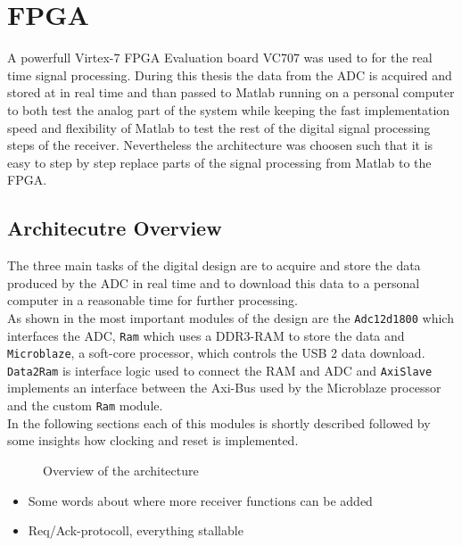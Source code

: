 \chapter{FPGA}
\label{chap:fpga}
A powerfull Virtex-7 \gls{FPGA} Evaluation board VC707
was used to for the real time signal processing.
During this thesis the data from the \gls{ADC} is acquired and stored at in real
time and than passed to Matlab running on a personal computer to both test
the analog part of the system while keeping the fast implementation speed
and flexibility of Matlab to test the rest of the digital signal processing steps
of the receiver. Nevertheless the architecture was choosen such that it is easy
to step by step replace parts of the signal processing from Matlab to the
\gls{FPGA}.

\section{Architecutre Overview}
The three main tasks of the digital design are to acquire and store the data
produced by the \gls{ADC} in real time and to download this data to a
personal computer in a reasonable time for further processing. \\

As shown in  the most important
modules of the design are the \verb|Adc12d1800| which interfaces the
\gls{ADC}, \verb|Ram| which uses a DDR3-\gls{RAM} to store the data
and \verb|Microblaze|, a soft-core processor, which controls the
\gls{USB} 2 data download. \verb|Data2Ram| is interface logic used
to connect the \gls{RAM} and \gls{ADC} and \verb|AxiSlave| implements
an interface between the Axi-Bus used by the Microblaze processor
and the custom \verb|Ram| module. \\

In the following sections each of this modules is shortly described followed
by some insights how clocking and reset is implemented.

\begin{figure}[ht]
  \centering
  \caption{Overview of the architecture}
  \label{fig:fpga_architecture_overview}
\end{figure}

\begin{itemize}
\item Some words about where more receiver functions can be added
\item Req/Ack-protocoll, everything stallable
\end{itemize}

